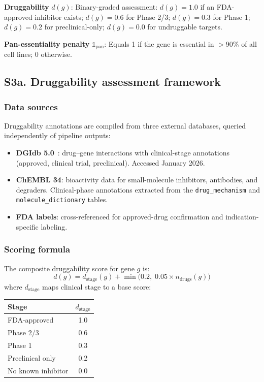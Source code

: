 \documentclass[11pt]{article}
\begin{document}
\textbf{Druggability} $d(g)$: Binary-graded assessment: $d(g) = 1.0$ if an FDA-approved inhibitor exists; $d(g) = 0.6$ for Phase 2/3; $d(g) = 0.3$ for Phase 1; $d(g) = 0.2$ for preclinical-only; $d(g) = 0.0$ for undruggable targets.

\textbf{Pan-essentiality penalty} $\mathbb{1}_{\text{pan}}$: Equals 1 if the gene is essential in $>$90\% of all cell lines; 0 otherwise.

\subsection{S3a. Druggability assessment framework}

\subsubsection*{Data sources}
Druggability annotations are compiled from three external databases, queried independently of pipeline outputs:
\begin{itemize}
  \item \textbf{DGIdb 5.0}~\cite{Freshour2021}: drug--gene interactions with clinical-stage annotations (approved, clinical trial, preclinical). Accessed January 2026.
  \item \textbf{ChEMBL 34}: bioactivity data for small-molecule inhibitors, antibodies, and degraders. Clinical-phase annotations extracted from the \texttt{drug\_mechanism} and \texttt{molecule\_dictionary} tables.
  \item \textbf{FDA labels}: cross-referenced for approved-drug confirmation and indication-specific labeling.
\end{itemize}

\subsubsection*{Scoring formula}
The composite druggability score for gene $g$ is:
\[
d(g) = d_{\text{stage}}(g) + \min\bigl(0.2,\; 0.05 \times n_{\text{drugs}}(g)\bigr)
\]
where $d_{\text{stage}}$ maps clinical stage to a base score:

\begin{center}
\begin{tabular}{@{}lc@{}}
\toprule
\textbf{Stage} & $d_{\text{stage}}$ \\
\midrule
FDA-approved & 1.0 \\
Phase 2/3 & 0.6 \\
Phase 1 & 0.3 \\
Preclinical only & 0.2 \\
No known inhibitor & 0.0 \\
\bottomrule
\end{tabular}
\end{center}
\end{document}
